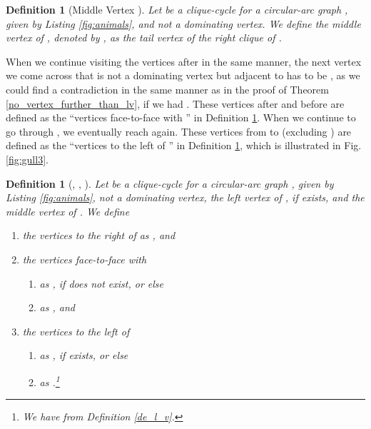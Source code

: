 \documentclass[10pt]{article}
\newtheorem{definition}[theorem]{Definition}
\newcommand{\q}[1]{``#1''}\newcommand{\fu}[1]{\mathcal{#1}}\newcommand{\mc}[1]{\mathsf{#1}}\newcommand{\ri}[1]{\mathscr{#1}}\newcommand{\co}[1]{\fu{C}({#1})}\newcommand{\lc}[1]{\alpha(#1)}\newcommand{\rc}[1]{\beta(#1)}\newcommand{\ema}[1]{\mathcal{#1}}\newcommand{\fe}[2]{\fu{F}(#1,#2)}\newcommand{\lv}[1]{l_{#1}}\newcommand{\rv}[1]{r_{#1}}\newcommand{\mv}[1]{m_{#1}}\newcommand{\lvv}{\lv{v}}
\begin{document}
\begin{definition}[Middle Vertex ]\label{de_m_v}
Let  be a clique-cycle for a cir\-cular-arc graph ,  
given by Listing \ref{fig:animals}, and  not a dominating vertex.
We define the \emph{middle vertex of }, denoted by ,  
as the tail vertex of the right clique of .
\end{definition}






When we continue visiting the vertices after  in the same manner, the next vertex  we come across that is not a dominating vertex but adjacent to  has to be , as we could find a contradiction in the same manner as 
in the proof of Theorem \ref{no_vertex_further_than_lv}, if we had .
These vertices after  and before  are defined as the \q{vertices face-to-face with } 
in Definition \ref{leftrightface}. When we continue to go through , we eventually 
reach  again. These vertices from  to  (excluding ) are defined 
as the \q{vertices to the left of } in Definition \ref{leftrightface}, which is illustrated in Fig. \ref{fig:gull3}.


\begin{definition}[, , ]\label{leftrightface}
Let  be a clique-cycle for a circular-arc graph ,  
given by Listing \ref{fig:animals},  not a dominating vertex,  the left 
vertex of , if  exists, and  the middle vertex of . We define
\begin{enumerate}
\item
the \emph{vertices to the right of } 
as , and 



\item
the \emph{vertices face-to-face with }
\begin{enumerate}



\item
as , if  does not exist, or else

\item
as , and
\end{enumerate}
\item 
the \emph{vertices to the left of }\begin{enumerate}

\item 
as , if  exists, or else

\item
as .\footnote{
We have  from Definition \ref{de_l_v}.
}
\end{enumerate}
\end{enumerate}
\end{definition}
\end{document}
